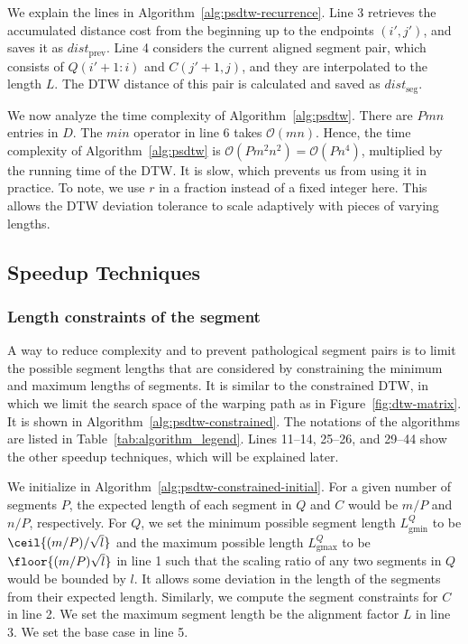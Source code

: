 We explain the lines in  Algorithm~\ref{alg:psdtw-recurrence}.
Line 3 retrieves the accumulated distance cost from the beginning up to the endpoints $(i', j')$, and saves it as $\textit{dist}_{\text{prev}}$. 
Line 4 considers the current aligned segment pair, which consists of $Q(i'+1:i)$ and $C(j'+1,j)$, and they are interpolated to the length $L$. The DTW distance of this pair is calculated and saved as $\textit{}{dist}_{\text{seg}}$.

We now analyze the time complexity of Algorithm~\ref{alg:psdtw}.
There are $Pmn$ entries in $D$.
The $min$ operator in line 6 takes $\mathcal{O}(mn)$.
Hence, the time complexity of Algorithm~\ref{alg:psdtw} is $\mathcal{O}(Pm^2n^2) = \mathcal{O}(Pn^4)$, multiplied by the running time of the DTW.
It is slow, which prevents us from using it in practice.
To note, we use $r$ in a fraction instead of a fixed integer here.
This allows the DTW deviation tolerance to scale adaptively with pieces of varying lengths.

\subsection{Speedup Techniques}

\subsubsection{Length constraints of the segment} %




A way to reduce complexity and to prevent pathological segment pairs is to limit the possible segment lengths that are considered
by constraining the minimum and maximum lengths of segments.
It is similar to the constrained DTW, in which we limit the search space of the warping path as in Figure~\ref{fig:dtw-matrix}.
It is shown in Algorithm~\ref{alg:psdtw-constrained}.
The notations of the algorithms are listed in Table~\ref{tab:algorithm_legend}.
Lines 11--14, 25--26, and 29--44 show the other speedup techniques, which will be explained later.

We initialize in Algorithm~\ref{alg:psdtw-constrained-initial}.
For a given number of segments $P$, the expected length of each segment in $Q$ and $C$ would be $m/P$ and $n/P$, respectively.
For $Q$, we set the minimum possible segment length $L_{\mathrm{gmin}}^Q$ to be $\ceil{(m/P)/\sqrt{l}}$ and the maximum possible length $L_{\mathrm{gmax}}^Q$ to be $\floor{(m/P)\sqrt{l}}$ in line 1 such that the scaling ratio of any two segments in $Q$ would be bounded by $l$.
It allows some deviation in the length of the segments from their expected length.
Similarly, we compute the segment constraints for $C$ in line 2.
We set the maximum segment length be the alignment factor $L$ in line 3.
We set the base case in line 5.

